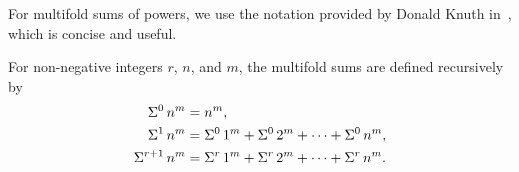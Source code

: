 For multifold sums of powers, we use the notation provided by Donald Knuth in~\cite{knuth1993johann},
which is concise and useful.
\begin{definition} 
  \label{def:multifold-sums-of-powers-recurrence}
  For non-negative integers $r$, $n$, and $m$, the multifold sums are defined recursively by
  \begin{align*}
    \Sigma^{0}\,{n}^{m}   &= n^m, \\
    \Sigma^{1}\,{n}^{m}   &= \Sigma^{0}\,{1}^{m}
    + \Sigma^{0}\,{2}^{m} + \cdots + \Sigma^{0}\,{n}^{m}, \\
    \Sigma^{r+1}\,{n}^{m} &= \Sigma^{r}\,{1}^{m}
    + \Sigma^{r}\,{2}^{m} + \cdots + \Sigma^{r}\,{n}^{m}.
  \end{align*}
\end{definition}
